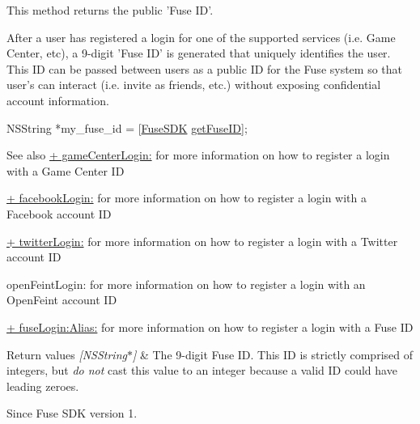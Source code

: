 This method returns the public 'Fuse I\+D'. 

After a user has registered a login for one of the supported services (i.\+e. Game Center, etc), a 9-\/digit 'Fuse I\+D' is generated that uniquely identifies the user. This I\+D can be passed between users as a public I\+D for the Fuse system so that user's can interact (i.\+e. invite as friends, etc.) without exposing confidential account information.


\begin{DoxyCode}
NSString *my\_fuse\_id = [\hyperlink{interface_fuse_s_d_k}{FuseSDK} \hyperlink{interface_fuse_s_d_k_ab483c2a3f4439aad8e19200cf24ff731}{getFuseID}];
\end{DoxyCode}


\begin{DoxySeeAlso}{See also}
\hyperlink{interface_fuse_s_d_k_a02a3bc5562d4f6e50bac5339f4ac4046}{+ game\+Center\+Login\+:} for more information on how to register a login with a Game Center I\+D 

\hyperlink{interface_fuse_s_d_k_a04c181e3ec49e81ba081a5041df412f6}{+ facebook\+Login\+:} for more information on how to register a login with a Facebook account I\+D 

\hyperlink{interface_fuse_s_d_k_add5138c113d6e4c1201f70bf8b84eb02}{+ twitter\+Login\+:} for more information on how to register a login with a Twitter account I\+D 

open\+Feint\+Login\+: for more information on how to register a login with an Open\+Feint account I\+D 

\hyperlink{interface_fuse_s_d_k_af7b69ec93b7a26b8512d730db9383511}{+ fuse\+Login\+:\+Alias\+:} for more information on how to register a login with a Fuse I\+D 
\end{DoxySeeAlso}

\begin{DoxyRetVals}{Return values}
{\em \mbox{[}\+N\+S\+String$\ast$\mbox{]}} & The 9-\/digit Fuse I\+D. This I\+D is strictly comprised of integers, but {\itshape do not} cast this value to an integer because a valid I\+D could have leading zeroes. \\
\hline
\end{DoxyRetVals}
\begin{DoxySince}{Since}
Fuse S\+D\+K version 1. 
\end{DoxySince}
\hypertarget{interface_fuse_s_d_k_a0267e0bb12395c93cea9442f62dcc53e}{}

